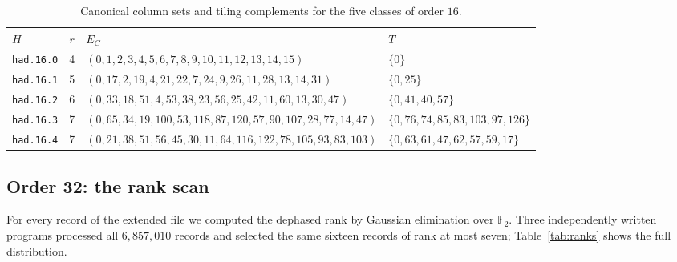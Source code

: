 \documentclass[11pt]{amsart}
\theoremstyle{definition}
\theoremstyle{remark}
\numberwithin{equation}{section}
\numberwithin{table}{section}
\newcommand{\F}{\mathbb{F}}
\begin{document}
\begin{table}[ht]
\centering
\caption{Canonical column sets and tiling complements for the five classes of order $16$.}\label{tab:sixteen}
\small
\begin{tabular}{@{}l c >{\raggedright\arraybackslash}p{} >{\raggedright\arraybackslash}p{}@{}}
\toprule
$H$ & $r$ & $E_C$ & $T$\\
\midrule
\texttt{had.16.0} & 4 & $(0,\allowbreak 1,\allowbreak 2,\allowbreak 3,\allowbreak 4,\allowbreak 5,\allowbreak 6,\allowbreak 7,\allowbreak 8,\allowbreak 9,\allowbreak 10,\allowbreak 11,\allowbreak 12,\allowbreak 13,\allowbreak 14,\allowbreak 15)$ & $\{0\}$ \\
\texttt{had.16.1} & 5 & $(0,\allowbreak 17,\allowbreak 2,\allowbreak 19,\allowbreak 4,\allowbreak 21,\allowbreak 22,\allowbreak 7,\allowbreak 24,\allowbreak 9,\allowbreak 26,\allowbreak 11,\allowbreak 28,\allowbreak 13,\allowbreak 14,\allowbreak 31)$ & $\{0,\allowbreak 25\}$ \\
\texttt{had.16.2} & 6 & $(0,\allowbreak 33,\allowbreak 18,\allowbreak 51,\allowbreak 4,\allowbreak 53,\allowbreak 38,\allowbreak 23,\allowbreak 56,\allowbreak 25,\allowbreak 42,\allowbreak 11,\allowbreak 60,\allowbreak 13,\allowbreak 30,\allowbreak 47)$ & $\{0,\allowbreak 41,\allowbreak 40,\allowbreak 57\}$ \\
\texttt{had.16.3} & 7 & $(0,\allowbreak 65,\allowbreak 34,\allowbreak 19,\allowbreak 100,\allowbreak 53,\allowbreak 118,\allowbreak 87,\allowbreak 120,\allowbreak 57,\allowbreak 90,\allowbreak 107,\allowbreak 28,\allowbreak 77,\allowbreak 14,\allowbreak 47)$ & $\{0,\allowbreak 76,\allowbreak 74,\allowbreak 85,\allowbreak 83,\allowbreak 103,\allowbreak 97,\allowbreak 126\}$ \\
\texttt{had.16.4} & 7 & $(0,\allowbreak 21,\allowbreak 38,\allowbreak 51,\allowbreak 56,\allowbreak 45,\allowbreak 30,\allowbreak 11,\allowbreak 64,\allowbreak 116,\allowbreak 122,\allowbreak 78,\allowbreak 105,\allowbreak 93,\allowbreak 83,\allowbreak 103)$ & $\{0,\allowbreak 63,\allowbreak 61,\allowbreak 47,\allowbreak 62,\allowbreak 57,\allowbreak 59,\allowbreak 17\}$ \\
\bottomrule
\end{tabular}
\end{table}

\subsection{Order 32: the rank scan}
For every record of the extended file we computed the dephased rank by Gaussian elimination over $\F_2$. Three independently written programs processed all $6{,}857{,}010$ records and selected the same sixteen records of rank at most seven; Table~\ref{tab:ranks} shows the full distribution.
\end{document}
